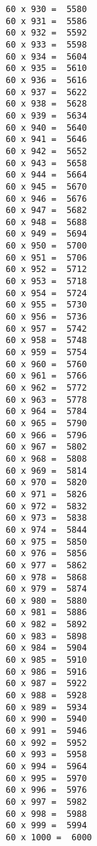 \documentclass[11pt]{article}
\makeatletter
\newcommand{\boxspacing}{\kern\kvtcb@left@rule\kern\kvtcb@boxsep}
\newcommand{\prompt}[4]{
        {\ttfamily\llap{{\color{#2}[#3]:\hspace{3pt}#4}}\vspace{-\baselineskip}}
    }
\makeatother
\begin{document}
\begin{Verbatim}[commandchars=\\\{\}]
60 x 930 =  5580
60 x 931 =  5586
60 x 932 =  5592
60 x 933 =  5598
60 x 934 =  5604
60 x 935 =  5610
60 x 936 =  5616
60 x 937 =  5622
60 x 938 =  5628
60 x 939 =  5634
60 x 940 =  5640
60 x 941 =  5646
60 x 942 =  5652
60 x 943 =  5658
60 x 944 =  5664
60 x 945 =  5670
60 x 946 =  5676
60 x 947 =  5682
60 x 948 =  5688
60 x 949 =  5694
60 x 950 =  5700
60 x 951 =  5706
60 x 952 =  5712
60 x 953 =  5718
60 x 954 =  5724
60 x 955 =  5730
60 x 956 =  5736
60 x 957 =  5742
60 x 958 =  5748
60 x 959 =  5754
60 x 960 =  5760
60 x 961 =  5766
60 x 962 =  5772
60 x 963 =  5778
60 x 964 =  5784
60 x 965 =  5790
60 x 966 =  5796
60 x 967 =  5802
60 x 968 =  5808
60 x 969 =  5814
60 x 970 =  5820
60 x 971 =  5826
60 x 972 =  5832
60 x 973 =  5838
60 x 974 =  5844
60 x 975 =  5850
60 x 976 =  5856
60 x 977 =  5862
60 x 978 =  5868
60 x 979 =  5874
60 x 980 =  5880
60 x 981 =  5886
60 x 982 =  5892
60 x 983 =  5898
60 x 984 =  5904
60 x 985 =  5910
60 x 986 =  5916
60 x 987 =  5922
60 x 988 =  5928
60 x 989 =  5934
60 x 990 =  5940
60 x 991 =  5946
60 x 992 =  5952
60 x 993 =  5958
60 x 994 =  5964
60 x 995 =  5970
60 x 996 =  5976
60 x 997 =  5982
60 x 998 =  5988
60 x 999 =  5994
60 x 1000 =  6000
    \end{Verbatim}

    \begin{tcolorbox}[breakable, size=fbox, boxrule=1pt, pad at break*=1mm,colback=cellbackground, colframe=cellborder]
\prompt{In}{incolor}{ }{\boxspacing}
\begin{Verbatim}[commandchars=\\\{\}]

\end{Verbatim}
\end{tcolorbox}

    \begin{tcolorbox}[breakable, size=fbox, boxrule=1pt, pad at break*=1mm,colback=cellbackground, colframe=cellborder]
\prompt{In}{incolor}{ }{\boxspacing}
\begin{Verbatim}[commandchars=\\\{\}]

\end{Verbatim}
\end{tcolorbox}


    
    
    
\end{document}
